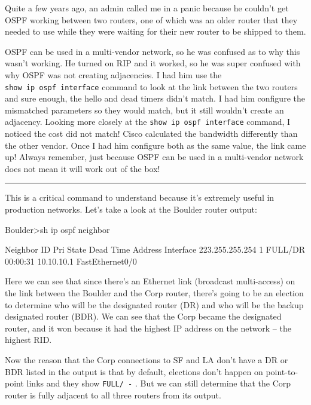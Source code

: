 Quite a few years ago, an admin called me in a panic because he couldn't
get OSPF working between two routers, one of which was an older router
that they needed to use while they were waiting for their new router to
be shipped to them.

OSPF can be used in a multi-vendor network, so he was confused as to why
this wasn't working. He turned on RIP and it worked, so he was super
confused with why OSPF was
\protect\hypertarget{c18.xhtmlux5cux23Page_770}{}{}not creating
adjacencies. I had him use the \texttt{show\ ip\ ospf\ interface}
command to look at the link between the two routers and sure enough, the
hello and dead timers didn't match. I had him configure the mismatched
parameters so they would match, but it still wouldn't create an
adjacency. Looking more closely at the
\texttt{show\ ip\ ospf\ interface} command, I noticed the cost did not
match! Cisco calculated the bandwidth differently than the other vendor.
Once I had him configure both as the same value, the link came up!
Always remember, just because OSPF can be used in a multi-vendor network
does not mean it will work out of the box!

\begin{center}\rule{0.5\linewidth}{0.5pt}\end{center}

This is a critical command to understand because it's extremely useful
in production networks. Let's take a look at the Boulder router output:

\begin{cli}
Boulder>sh ip ospf neighbor

Neighbor ID     Pri   State    Dead Time   Address         Interface
223.255.255.254   1   FULL/DR  00:00:31    10.10.10.1      FastEthernet0/0
\end{cli}

Here we can see that since there's an Ethernet link (broadcast
multi-access) on the link between the Boulder and the Corp router,
there's going to be an election to determine who will be the designated
router (DR) and who will be the backup designated router (BDR). We can
see that the Corp became the designated router, and it won because it
had the highest IP address on the network -- the highest RID.

Now the reason that the Corp connections to SF and LA don't have a DR or
BDR listed in the output is that by default, elections don't happen on
point-to-point links and they show \texttt{FULL/\ -} . But we can still
determine that the Corp router is fully adjacent to all three routers
from its output.

